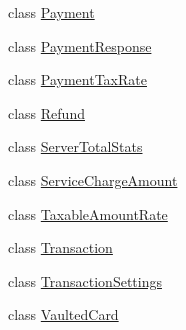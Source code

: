 \begin{DoxyCompactItemize}
\item 
class \hyperlink{classcom_1_1clover_1_1sdk_1_1v3_1_1payments_1_1_payment}{Payment}
\item 
class \hyperlink{classcom_1_1clover_1_1sdk_1_1v3_1_1payments_1_1_payment_response}{Payment\+Response}
\item 
class \hyperlink{classcom_1_1clover_1_1sdk_1_1v3_1_1payments_1_1_payment_tax_rate}{Payment\+Tax\+Rate}
\item 
class \hyperlink{classcom_1_1clover_1_1sdk_1_1v3_1_1payments_1_1_refund}{Refund}
\item 
class \hyperlink{classcom_1_1clover_1_1sdk_1_1v3_1_1payments_1_1_server_total_stats}{Server\+Total\+Stats}
\item 
class \hyperlink{classcom_1_1clover_1_1sdk_1_1v3_1_1payments_1_1_service_charge_amount}{Service\+Charge\+Amount}
\item 
class \hyperlink{classcom_1_1clover_1_1sdk_1_1v3_1_1payments_1_1_taxable_amount_rate}{Taxable\+Amount\+Rate}
\item 
class \hyperlink{classcom_1_1clover_1_1sdk_1_1v3_1_1payments_1_1_transaction}{Transaction}
\item 
class \hyperlink{classcom_1_1clover_1_1sdk_1_1v3_1_1payments_1_1_transaction_settings}{Transaction\+Settings}
\item 
class \hyperlink{classcom_1_1clover_1_1sdk_1_1v3_1_1payments_1_1_vaulted_card}{Vaulted\+Card}
\end{DoxyCompactItemize}
